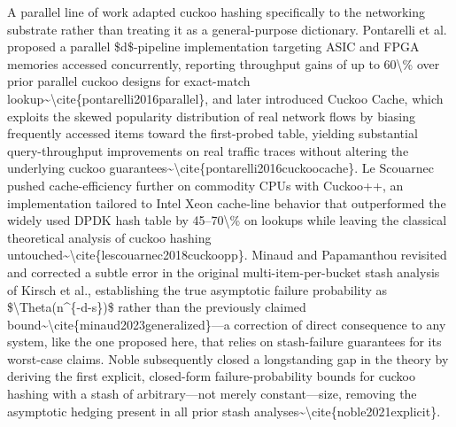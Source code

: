 \documentclass[conference]{IEEEtran}
\begin{document}
A parallel line of work adapted cuckoo hashing specifically to the networking substrate rather than treating it as a general-purpose dictionary. Pontarelli et al. proposed a parallel \$d\$-pipeline implementation targeting ASIC and FPGA memories accessed concurrently, reporting throughput gains of up to 60\textbackslash{}\% over prior parallel cuckoo designs for exact-match lookup\~{}\textbackslash{}cite\{pontarelli2016parallel\}, and later introduced Cuckoo Cache, which exploits the skewed popularity distribution of real network flows by biasing frequently accessed items toward the first-probed table, yielding substantial query-throughput improvements on real traffic traces without altering the underlying cuckoo guarantees\~{}\textbackslash{}cite\{pontarelli2016cuckoocache\}. Le Scouarnec pushed cache-efficiency further on commodity CPUs with Cuckoo++, an implementation tailored to Intel Xeon cache-line behavior that outperformed the widely used DPDK hash table by 45--70\textbackslash{}\% on lookups while leaving the classical theoretical analysis of cuckoo hashing untouched\~{}\textbackslash{}cite\{lescouarnec2018cuckoopp\}. Minaud and Papamanthou revisited and corrected a subtle error in the original multi-item-per-bucket stash analysis of Kirsch et al., establishing the true asymptotic failure probability as \$\textbackslash{}Theta(n\^{}\{-d-s\})\$ rather than the previously claimed bound\~{}\textbackslash{}cite\{minaud2023generalized\}---a correction of direct consequence to any system, like the one proposed here, that relies on stash-failure guarantees for its worst-case claims. Noble subsequently closed a longstanding gap in the theory by deriving the first explicit, closed-form failure-probability bounds for cuckoo hashing with a stash of arbitrary---not merely constant---size, removing the asymptotic hedging present in all prior stash analyses\~{}\textbackslash{}cite\{noble2021explicit\}.
\end{document}

